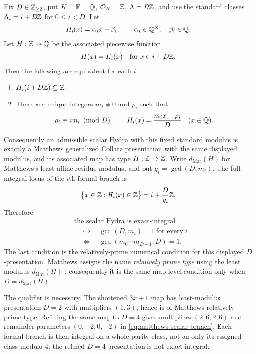 \begin{proposition}
\label{prop:scalar-hydra-matthews}
Fix $D\in\mathbb Z_{\geq2}$, put $K=\mathbb F=\mathbb Q$, $\mathcal O_K=\mathbb Z$, $\Lambda=D\mathbb Z$, and use the standard
classes $\Lambda_i=i+D\mathbb Z$ for $0\leq i<D$.  Let
\[
 H_i(x)=\alpha_i x+\beta_i,
 \qquad \alpha_i\in\mathbb Q^\times,\quad \beta_i\in\mathbb Q.
\]
Let $H:\mathbb Z\to\mathbb Q$ be the associated piecewise function
\[
 H(x)=H_i(x)\quad\text{for }x\in i+D\mathbb Z.
\]
Then the following are equivalent for each $i$.
\begin{enumerate}[label=\textup{(\roman*)}]
\item $H_i(i+D\mathbb Z)\subseteq\mathbb Z$.
\item There are unique integers
      $m_i\ne0$ and $\rho_i$ such that
      \begin{equation}
      \label{eq:matthews-scalar-branch}
       \rho_i\equiv i m_i\pmod D,
       \qquad
       H_i(x)=\frac{m_i x-\rho_i}{D}
       \quad(x\in\mathbb Q).
      \end{equation}
\end{enumerate}
Consequently an admissible scalar Hydra with this fixed standard modulus is
exactly a Matthews generalized Collatz presentation with the same displayed
modulus, and its associated map has type $H:\mathbb Z\to\mathbb Z$.  Write
$d_{\mathrm{Mat}}(H)$ for Matthews's least affine residue modulus, and put
$g_i=\gcd(D,m_i)$.  The full integral locus of the $i$th formal
branch is
\[
 \bigl\{x\in\mathbb Z:H_i(x)\in\mathbb Z\bigr\}
 =i+\frac{D}{g_i}\mathbb Z.
\]
Therefore
\begin{equation}
\label{eq:scalar-exact-integral-relatively-prime}
 \begin{aligned}
 &\text{the scalar Hydra is exact-integral}\\
 &\quad\Longleftrightarrow\quad
   \gcd(D,m_i)=1\ \text{for every }i\\
 &\quad\Longleftrightarrow\quad
   \gcd(m_0\cdots m_{D-1},D)=1.
 \end{aligned}
\end{equation}
The last condition is the relatively-prime numerical condition for this
displayed $D$-presentation.  Matthews assigns the name
\emph{relatively prime type} using the least modulus
$d_{\mathrm{Mat}}(H)$ \cite[Sec.~2]{MatthewsGeneralized}; consequently it is
the same map-level condition only when $D=d_{\mathrm{Mat}}(H)$.

The qualifier is necessary.  The shortened $3x+1$ map has least-modulus
presentation $D=2$ with multipliers $(1,3)$, hence is of Matthews relatively
prime type.  Refining the same map to $D=4$ gives multipliers
$(2,6,2,6)$ and remainder parameters $(0,-2,0,-2)$ in
\cref{eq:matthews-scalar-branch}.  Each formal branch is then integral on a
whole parity class, not on only its assigned class modulo $4$; the refined
$D=4$ presentation is not exact-integral.
\end{proposition}

